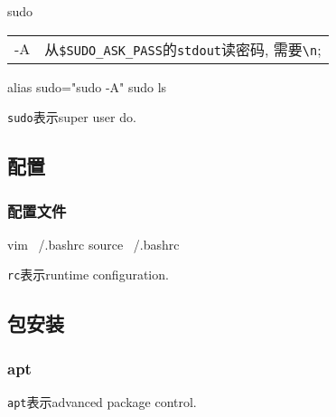 \documentclass[hidelinks]{ctexart}
\begin{document}
\begin{shcommand}{sudo}
\ttfamily
\begin{tabular}{@{$\bullet\quad$}ll}
   -A      & 从\texttt{\$SUDO\_ASK\_PASS}的\texttt{stdout}读密码, 需要\texttt{\textbackslash n};
\end{tabular} 
\end{shcommand}
\begin{shlst}
alias sudo="sudo -A"
sudo ls
\end{shlst}
\texttt{sudo}表示super user do.



\subsection{配置} %
\label{sub:配置}

\subsubsection{配置文件} %
\label{ssub:配置文件}

\begin{shlst}
vim ~/.bashrc
source ~/.bashrc
\end{shlst}
\texttt{rc}表示runtime configuration.



\subsection{包安装} %
\label{sub:包安装}

\subsubsection{apt} %
\label{ssub:apt}

\texttt{apt}表示advanced package control.



\end{document}
